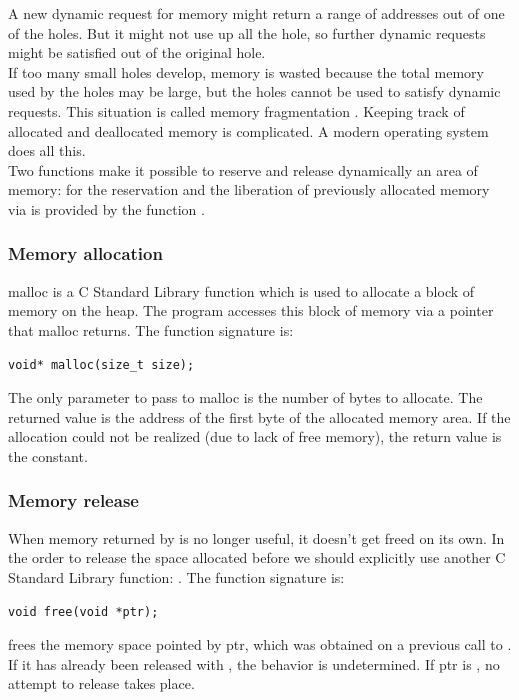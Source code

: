 A new dynamic request for memory might return a range of addresses out of one of the holes. But it might not use up all the hole, so further dynamic requests might be satisfied out of the original hole.\\

If too many small holes develop, memory is wasted because the total memory used by the holes may be large, but the holes cannot be used to satisfy dynamic requests. This situation is called memory fragmentation \cite{Knuth73a}. Keeping track of allocated and deallocated memory is complicated. A modern operating system does all this.\\

Two functions make it possible to reserve and release dynamically an area of memory:  for the reservation and the liberation of previously allocated memory via  is provided by the  function \cite{WikipediaDMA}.

\subsubsection{Memory allocation}
malloc is a C Standard Library function which is used to allocate a block of memory on the heap. The program accesses this block of memory via a pointer that malloc returns.
The function signature is:

\begin{lstlisting}[style=cstyle]
void* malloc(size_t size);
\end{lstlisting}

The only parameter to pass to malloc is the number of bytes to allocate. The returned value is the address of the first byte of the allocated memory area. If the allocation could not be realized (due to lack of free memory), the return value is the  constant.

\subsubsection{Memory release}
When memory returned by  is no longer useful, it doesn't get freed on its own. In the order to release the space allocated before we should explicitly use another C Standard Library function:  .
The function signature is:
\begin{lstlisting}[style=cstyle]
void free(void *ptr);
\end{lstlisting}
 frees the memory space pointed by ptr, which was obtained on a previous call to . If it has already been released with , the behavior is undetermined. If ptr is , no attempt to release takes place.


